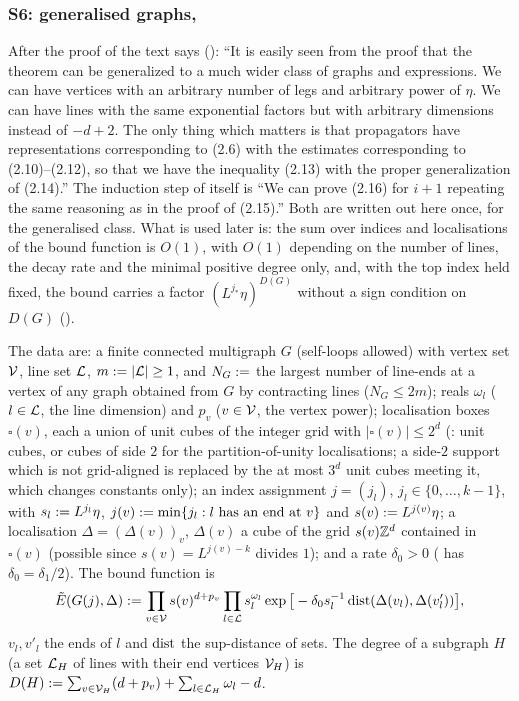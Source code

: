 
\subsubsection{S6: generalised graphs, \cite[Prop.~2.2]{Ba3}}\label{sup2:ssec:S6}

After the proof of \cite[Prop.~2.1]{Ba3} the text says (\cite[p.~428]{Ba3}): ``It is easily seen from the proof that the theorem can be generalized to a much wider class of graphs and expressions. We can have vertices with an arbitrary number of legs and arbitrary power of $\eta$. We can have lines with the same exponential factors but with arbitrary dimensions instead of $-d+2$. The only thing which matters is that propagators have representations corresponding to (2.6) with the estimates corresponding to (2.10)--(2.12), so that we have the inequality (2.13) with the proper generalization of (2.14).'' The induction step of \cite[Prop.~2.1]{Ba3} itself is ``We can prove (2.16) for $i+1$ repeating the same reasoning as in the proof of (2.15).'' Both are written out here once, for the generalised class. What is used later is: the sum over indices and localisations of the bound function is $O(1)$, with $O(1)$ depending on the number of lines, the decay rate and the minimal positive degree only, and, with the top index held fixed, the bound carries a factor $(L^{j_*}\eta)^{D(G)}$ without a sign condition on $D(G)$ (\cite[(3.4)--(3.5)]{Ba3}).

\begin{definition}\label{sup2:def:S6bf}
The data are: a finite connected multigraph $G$ (self-loops allowed) with vertex set $\mathcal V$, line set $\mathcal L$, $m:=|\mathcal L|\ge1$, and $N_G:=$ the largest number of line-ends at a vertex of any graph obtained from $G$ by contracting lines ($N_G\le2m$); reals $\omega_l$ ($l\in\mathcal L$, the line dimension) and $p_v$ ($v\in\mathcal V$, the vertex power); localisation boxes $\square(v)$, each a union of unit cubes of the integer grid with $|\square(v)|\le2^d$ (\cite[p.~420]{Ba3}: unit cubes, or cubes of side $2$ for the partition-of-unity localisations; a side-$2$ support which is not grid-aligned is replaced by the at most $3^d$ unit cubes meeting it, which changes constants only); an index assignment $j=(j_l)$, $j_l\in\{0,\dots,k-1\}$, with $s_l:= L^{j_l}\eta$, $j(v):=\min\{j_l:l\text{ has an end at }v\}$ and $s(v):= L^{j(v)}\eta$; a localisation $\Delta=(\Delta(v))_v$, $\Delta(v)$ a cube of the grid $s(v)\mathbb Z^d$ contained in $\square(v)$ (possible since $s(v)=L^{j(v)-k}$ divides $1$); and a rate $\delta_0>0$ (\cite[(2.14)]{Ba3} has $\delta_0=\delta_1/2$). The bound function is
\[
\tilde E(G(j),\Delta):=\prod_{v\in\mathcal V}s(v)^{d+p_v}\prod_{l\in\mathcal L}s_l^{\omega_l}\exp\big[-\delta_0s_l^{-1}\operatorname{dist}(\Delta(v_l),\Delta(v'_l))\big],
\]
$v_l,v'_l$ the ends of $l$ and $\operatorname{dist}$ the sup-distance of sets. The degree of a subgraph $H$ (a set $\mathcal L_H$ of lines with their end vertices $\mathcal V_H$) is $D(H):=\sum_{v\in\mathcal V_H}(d+p_v)+\sum_{l\in\mathcal L_H}\omega_l-d$.
\end{definition}

